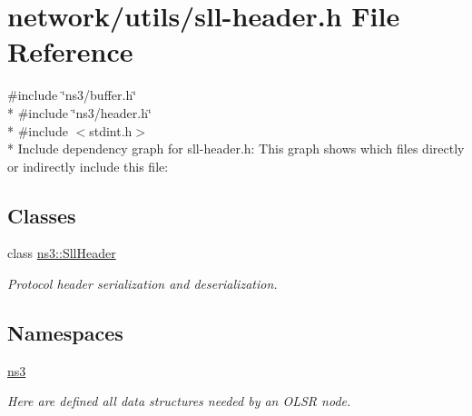 \hypertarget{sll-header_8h}{}\section{network/utils/sll-\/header.h File Reference}
\label{sll-header_8h}
{\ttfamily \#include \char`\"{}ns3/buffer.\+h\char`\"{}}\\*
{\ttfamily \#include \char`\"{}ns3/header.\+h\char`\"{}}\\*
{\ttfamily \#include $<$stdint.\+h$>$}\\*
Include dependency graph for sll-\/header.h\+:
This graph shows which files directly or indirectly include this file\+:
\subsection*{Classes}
\begin{DoxyCompactItemize}
\item 
class \hyperlink{classns3_1_1SllHeader}{ns3\+::\+Sll\+Header}
\begin{DoxyCompactList}\small\item\em Protocol header serialization and deserialization. \end{DoxyCompactList}\end{DoxyCompactItemize}
\subsection*{Namespaces}
\begin{DoxyCompactItemize}
\item 
 \hyperlink{namespacens3}{ns3}
\begin{DoxyCompactList}\small\item\em Here are defined all data structures needed by an O\+L\+SR node. \end{DoxyCompactList}\end{DoxyCompactItemize}
